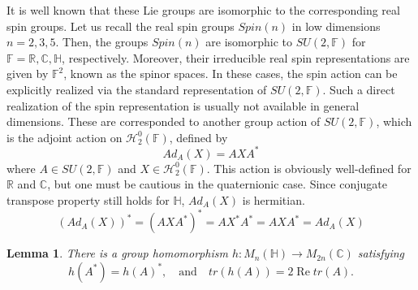 \documentclass[a4paper]{article}%
\newtheorem{lemma}[theorem]{Lemma}
\begin{document}
It is well known that these Lie groups are isomorphic to the corresponding
real spin groups. Let us recall the real spin groups $Spin(n)$ in low
dimensions $n=2,3,5$. Then, the groups $Spin(n)$ are isomorphic to
$SU(2,\mathbb{F})$ for $\mathbb{F}=\mathbb{R},\mathbb{C},\mathbb{H}$,
respectively. Moreover, their irreducible real spin representations are given
by $\mathbb{F}^{2}$, known as the spinor spaces. In these cases, the spin
action can be explicitly realized via the standard representation of
$SU(2,\mathbb{F})$. Such a direct realization of the spin representation is
usually not available in general dimensions. These are corresponded to another
group action of $SU(2,\mathbb{F})$, which is the adjoint action on
$\mathcal{H}_{2}^{0}(\mathbb{F})$, defined by
\[
Ad_{A}(X)=AXA^{\ast}%
\]
where $A\in SU(2,\mathbb{F})$ and $X\in\mathcal{H}_{2}^{0}(\mathbb{F})$. This
action is obviously well-defined for $\mathbb{R}$ and $\mathbb{C}$, but one
must be cautious in the quaternionic case. Since conjugate transpose property
still holds for $\mathbb{H}$, $Ad_{A}(X)$ is hermitian.
\[
(Ad_{A}(X))^{\ast}=(AXA^{\ast})^{\ast}=AX^{\ast}A^{\ast}=AXA^{\ast}=Ad_{A}(X)
\]


\begin{lemma}
\label{HtoC} There is a group homomorphism $h:M_{n}(\mathbb{H})\rightarrow
M_{2n}(\mathbb{C})$ satisfying
\[
h(A^{\ast})=h(A)^{\ast},\quad\text{and}\quad tr\left(  h(A)\right)
=2\operatorname{Re}tr(A).
\]

\end{lemma}
\end{document}
